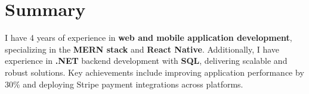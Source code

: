 \section{Summary}
I have 4 years of experience in \textbf{web and mobile application development}, specializing in the \textbf{MERN stack} and \textbf{React Native}. Additionally, I have experience in \textbf{.NET} backend development with \textbf{SQL}, delivering scalable and robust solutions. Key achievements include improving application performance by 30\% and deploying Stripe payment integrations across platforms.
